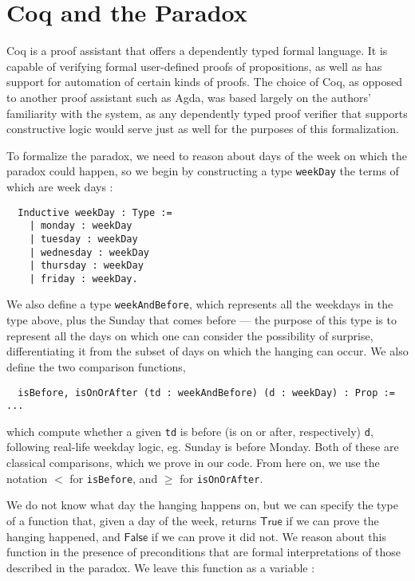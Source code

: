 \documentclass[journal]{journal}
\begin{document}
\section{Coq and the Paradox}
\label{sec:form}

Coq is a proof assistant that offers a dependently typed formal language.
It is capable of verifying formal user-defined proofs of propositions, as well as has support
for automation of certain kinds of proofs. The choice of Coq, as opposed to another
proof assistant such as Agda, was based largely on the authors' familiarity with the system,
as any dependently typed proof verifier that supports constructive logic
would serve just as well for the purposes of this formalization.

To formalize the paradox, we need to reason about days of the week on which
the paradox could happen, so we
begin by constructing a type {\tt weekDay} the terms of which are week days :

\begin{lstlisting}
  Inductive weekDay : Type :=
    | monday : weekDay
    | tuesday : weekDay
    | wednesday : weekDay
    | thursday : weekDay
    | friday : weekDay.
\end{lstlisting}

We also define a type {\tt weekAndBefore}, which represents all the weekdays in
the type above, plus the Sunday that comes before --- the purpose of this type is to
represent all the days on which one can consider the possibility of surprise,
differentiating it from the subset of days on which the hanging can occur. We
also define the two comparison functions,

\begin{lstlisting}
  isBefore, isOnOrAfter (td : weekAndBefore) (d : weekDay) : Prop := ...
\end{lstlisting}

which compute whether a given {\tt td} is before (is on or after, respectively) {\tt d},
following real-life weekday logic, eg. Sunday is before Monday.
Both of these are classical comparisons, which we prove in our code.
From here on, we use the notation $<$ for {\tt isBefore}, and
$\geq$ for {\tt isOnOrAfter}.

We do not know what day the hanging happens on, but we can specify the type of a
function that, given a day of the week, returns $\mathsf{True}$ if we can prove the hanging
happened, and $\mathsf{False}$ if we can prove it did not. We reason about this function
in the presence of preconditions that are formal interpretations of those described
in the paradox. We leave this function as a variable :
\end{document}
